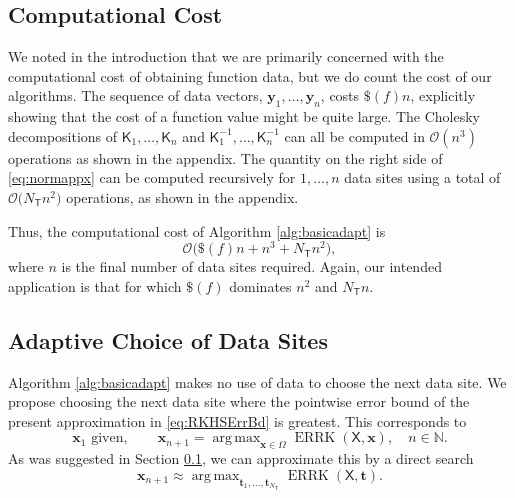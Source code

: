 \documentclass[]{mcom-l}
\theoremstyle{remark}
\DeclareMathOperator*{\argmax}{arg\,max}
\DeclareMathOperator{\errK}{ERRK}
\newcommand{\NT}{{N_{\mT}}}
\newcommand{\naturals}{{\mathbb{N}}}
\newcommand{\mK}{\mathsf{K}}
\newcommand{\mT}{\mathsf{T}}
\newcommand{\mX}{\mathsf{X}}
\newcommand{\bx}{{\boldsymbol{x}}}
\newcommand{\by}{{\boldsymbol{y}}}
\newcommand{\bt}{{\boldsymbol{t}}}
\newcommand{\Order}{\mathcal{O}}
\begin{document}
\subsection{Computational Cost} \label{sec:compCost}
We noted in the introduction that we are primarily concerned with the computational cost of obtaining function data, but we do count the cost of our algorithms.  The sequence of data vectors, $\by_1, \ldots, \by_n$, costs $\$(f)n$, explicitly showing that the cost of a function value might be quite large.  The Cholesky decompositions of $\mK_1, \ldots, \mK_n$ and $\mK_1^{-1}, \ldots, \mK_n^{-1}$ can all be computed in $\Order(n^3)$ operations as shown in the appendix.  The quantity on the right side of \eqref{eq:normappx} can be computed recursively for $1, \ldots, n$ data sites using a total of $\Order\bigl( \NT n^2 \bigr)$ operations, as shown in the appendix.  

Thus, the computational cost of Algorithm \ref{alg:basicadapt} is
\begin{equation} \label{eq:compcostbasic}
\Order\bigl(\$(f)n + n^3 + \NT n^2 \bigr),
\end{equation}
where $n$ is the final number of data sites required.  Again, our intended application is that for which $\$(f)$ dominates $n^2$ and $\NT n$.  



\subsection{Adaptive Choice of Data Sites }  \label{sec:adaptSites}

Algorithm \ref{alg:basicadapt} makes no use of data to choose the next data site.  We propose choosing  the next data site where the pointwise error bound of the present approximation in \eqref{eq:RKHSErrBd} is greatest.  This corresponds to 
\begin{equation}  \label{eq:nextsample}
\bx_1 \text{ given}, \qquad
 \bx_{n+1} = \argmax_{\bx \in \Omega}\errK(\mX,\bx), \quad n \in \naturals.
\end{equation}
As was suggested in Section \ref{sec:compCost}, we can approximate this by a direct search
\begin{equation} \label{eq:nextsampleAPPX}
\bx_{n+1} \approx \argmax_{\bt_1, \ldots, \bt_\NT} \errK(\mX,\bt).
\end{equation}
\end{document}
